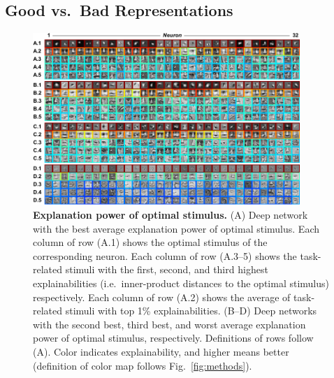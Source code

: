 
\subsection*{Good vs.~Bad Representations} %

\begin{figure}
\centering \includegraphics[width=0.9\textwidth]{Figs/pic2.pdf}
\caption{
{\bf Explanation power of optimal stimulus.} (A) Deep network with the best average explanation power of optimal stimulus. Each column of row (A.1) shows the optimal stimulus of the corresponding neuron. Each column of row (A.3--5) shows the task-related stimuli with the first, second, and third highest explainabilities (i.e.~inner-product distances to the optimal stimulus) respectively. Each column of row (A.2) shows the average of task-related stimuli with top 1\% explainabilities. (B--D) Deep networks with the second best, third best, and worst average explanation power of optimal stimulus, respectively. Definitions of rows follow (A). Color indicates explainability, and higher means better (definition of color map follows Fig.~\ref{fig:methods}).}
\label{fig:ind_exp}
\end{figure}


